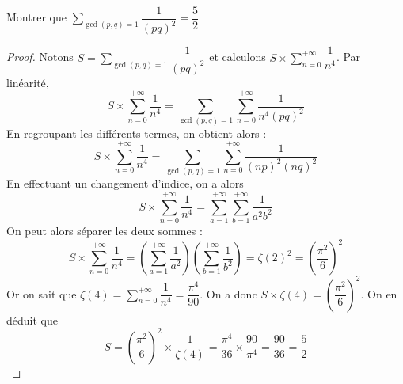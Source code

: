 \begin{exercice}
Montrer que $\displaystyle\sum\limits_{\gcd(p, q) = 1} \dfrac{1}{(pq)^2} = \dfrac{5}{2}$ 
\end{exercice}

\begin{proof}
Notons $S = \displaystyle\sum\limits_{\gcd(p, q) = 1} \dfrac{1}{(pq)^2}$ et calculons $S \times \displaystyle\sum\limits_{n=0}^{+\infty} \dfrac{1}{n^4}$. Par linéarité, 
\[
S \times \displaystyle\sum\limits_{n=0}^{+\infty} \dfrac{1}{n^4}
=  \displaystyle\sum\limits_{\gcd(p, q) = 1} \sum\limits_{n=0}^{+\infty} \dfrac{1}{n^4(pq)^2}
\]
En regroupant les différents termes, on obtient alors :
\[
S \times \displaystyle\sum\limits_{n=0}^{+\infty} \dfrac{1}{n^4} 
= \displaystyle\sum\limits_{\gcd(p, q) = 1} \sum\limits_{n=0}^{+\infty} \dfrac{1}{(np)^2(nq)^2}
\]
En effectuant un changement d'indice, on a alors 
\[
S \times \displaystyle\sum\limits_{n=0}^{+\infty} \dfrac{1}{n^4} 
= \displaystyle\sum\limits_{a= 1}^{+\infty} \displaystyle\sum\limits_{b=1}^{+\infty} \dfrac{1}{a^2 b^2}
\]
On peut alors séparer les deux sommes :
\[
S \times \displaystyle\sum\limits_{n=0}^{+\infty} \dfrac{1}{n^4} = \left(\displaystyle\sum\limits_{a= 1}^{+\infty} \dfrac{1}{a^2 }\right)\left(\displaystyle\sum\limits_{b=1}^{+\infty} \dfrac{1}{b^2}\right) = \zeta(2)^2 = \left(\dfrac{\pi^2}{6}\right)^2
\]
Or on sait que $\zeta(4) = \displaystyle\sum\limits_{n=0}^{+\infty} \dfrac{1}{n^4} = \dfrac{\pi^4}{90}
$. On a donc $S  \times \zeta(4) = \left(\dfrac{\pi^2}{6}\right)^2
$. On en déduit que 
\[
S = \left(\dfrac{\pi^2}{6}\right)^2 \times \dfrac{1}{\zeta(4)}= \dfrac{\pi^4}{36} \times \dfrac{90}{\pi^4} = \dfrac{90}{36} = \dfrac{5}{2}
\]
\end{proof}